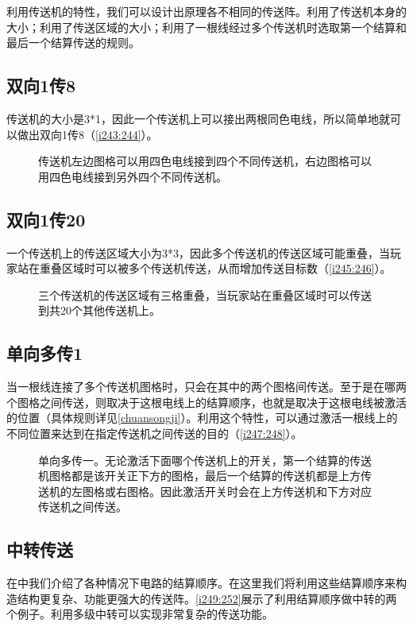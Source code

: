 利用传送机的特性，我们可以设计出原理各不相同的传送阵。利用了传送机本身的大小；利用了传送区域的大小；利用了一根线经过多个传送机时选取第一个结算和最后一个结算传送的规则。

\subsection{双向1传8}\label{sec11}
传送机的大小是3*1，因此一个传送机上可以接出两根同色电线，所以简单地就可以做出双向1传8（\autoref{i243:244}）。

\begin{figure}[!ht]
\centering
{}
\caption{传送机左边图格可以用四色电线接到四个不同传送机，右边图格可以用四色电线接到另外四个不同传送机。}
\label{i243:244}
\end{figure}

\subsection{双向1传20}\label{sec12}
一个传送机上的传送区域大小为3*3，因此多个传送机的传送区域可能重叠，当玩家站在重叠区域时可以被多个传送机传送，从而增加传送目标数（\autoref{i245:246}）。

\begin{figure}[!ht]
\centering
{}
\caption{三个传送机的传送区域有三格重叠，当玩家站在重叠区域时可以传送到共20个其他传送机上。}
\label{i245:246}
\end{figure}

\subsection{单向多传1}\label{sec13}
当一根线连接了多个传送机图格时，只会在其中的两个图格间传送。至于是在哪两个图格之间传送，则取决于这根电线上的结算顺序，也就是取决于这根电线被激活的位置（具体规则详见\autoref{chuansongji}）。利用这个特性，可以通过激活一根线上的不同位置来达到在指定传送机之间传送的目的（\autoref{i247:248}）。

\begin{figure}[!ht]
\centering
{}
\caption{单向多传一。无论激活下面哪个传送机上的开关，第一个结算的传送机图格都是该开关正下方的图格，最后一个结算的传送机都是上方传送机的左图格或右图格。因此激活开关时会在上方传送机和下方对应传送机之间传送。}
\label{i247:248}
\end{figure}

\subsection{中转传送}
在中我们介绍了各种情况下电路的结算顺序。在这里我们将利用这些结算顺序来构造结构更复杂、功能更强大的传送阵。\autoref{i249:252}展示了利用结算顺序做中转的两个例子。利用多级中转可以实现非常复杂的传送功能。

